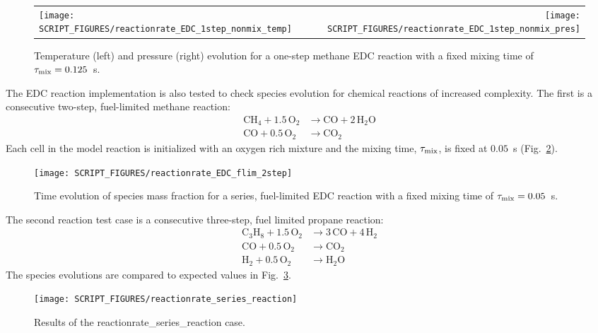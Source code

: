 \documentclass[11pt]{book}
\begin{document}
\begin{figure}[!ht]
\begin{tabular*}{\textwidth}{lr}
\texttt{[image: SCRIPT\_FIGURES/reactionrate\_EDC\_1step\_nonmix\_temp]} &
\texttt{[image: SCRIPT\_FIGURES/reactionrate\_EDC\_1step\_nonmix\_pres]}
\end{tabular*}
\caption[Temperature and pressure evolution in a 1-step Methane EDC reaction]{Temperature (left) and pressure (right) evolution for a one-step methane EDC reaction with a fixed mixing time of $\tau_{\rm mix}=0.125$~s.}
\label{fig:EDC_meth_non_temppres}
\end{figure}

The EDC reaction implementation is also tested to check species evolution for chemical reactions of increased complexity. The first is a consecutive two-step, fuel-limited methane reaction:
\begin{align}\label{eq:2step_methane}
\mathrm{CH_4 + 1.5 \, O_2} &\rightarrow  \mathrm{CO + 2 \, H_2O} \\
\nonumber \mathrm{CO + 0.5 \, O_2} &\rightarrow \mathrm{CO_2}
\end{align}
Each cell in the model reaction is initialized with an oxygen rich mixture and the mixing time, $\tau_{\rm mix}$, is fixed at $0.05$~s (Fig.~\ref{fig:EDC_2Step_fuel}).

\begin{figure}[!ht]
\centering
\texttt{[image: SCRIPT\_FIGURES/reactionrate\_EDC\_flim\_2step]}
\caption[Species evolution in 2-step methane EDC reaction]{Time evolution of species mass fraction for a series, fuel-limited EDC reaction with a fixed mixing time of $\tau_{\rm mix}=0.05$~s.}
\label{fig:EDC_2Step_fuel}
\end{figure}

The second reaction test case is a consecutive three-step, fuel limited propane reaction:
\begin{align}\label{eq:3step_propane}
\mathrm{C_3H_8 + 1.5 \, O_2} &\rightarrow  \mathrm{3 \,CO + 4 \, H_2} \\
\nonumber \mathrm{CO + 0.5 \, O_2} &\rightarrow \mathrm{CO_2} \\
\nonumber \mathrm{H_2 + 0.5 \, O_2} &\rightarrow \mathrm{H_2O}
\end{align}
The species evolutions are compared to expected values in Fig.~\ref{fig:reactionrate_series_reaction}.

\begin{figure}[!ht]
\centering
\texttt{[image: SCRIPT\_FIGURES/reactionrate\_series\_reaction]}
\caption[Results of the {\ct reactionrate\_series\_reaction} case]{Results of the {\ct reactionrate\_series\_reaction} case.}
\label{fig:reactionrate_series_reaction}
\end{figure}
\end{document}
